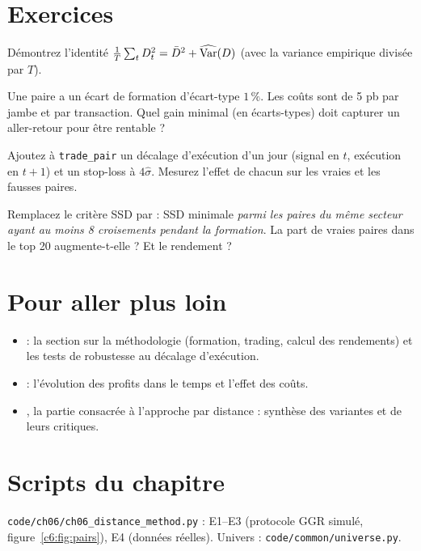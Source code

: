 \section{Exercices}

\begin{exercise}
Démontrez l'identité $\frac1T\sum_tD_t^2 = \bar D^2 + \widehat{\operatorname{Var}}(D)$ (avec la variance empirique divisée par $T$).
\end{exercise}

\begin{exercise}
Une paire a un écart de formation d'écart-type $1\,\%$. Les coûts sont de 5 pb par jambe et par transaction. Quel gain minimal (en écarts-types) doit capturer un aller-retour pour être rentable ?
\end{exercise}

\begin{exercise}[à coder]
Ajoutez à \texttt{trade\_pair} un décalage d'exécution d'un jour (signal en $t$, exécution en $t+1$) et un stop-loss à $4\hat\sigma$. Mesurez l'effet de chacun sur les vraies et les fausses paires.
\end{exercise}

\begin{exercise}[à coder]
Remplacez le critère SSD par : SSD minimale \emph{parmi les paires du même secteur ayant au moins 8 croisements pendant la formation}. La part de vraies paires dans le top 20 augmente-t-elle ? Et le rendement ?
\end{exercise}

\section{Pour aller plus loin}

\begin{toread}
\begin{itemize}[leftmargin=1.2em]
\item \citet{gatev2006} : la section sur la méthodologie (formation, trading, calcul des rendements) et les tests de robustesse au décalage d'exécution.
\item \citet{dofaff2010,dofaff2012} : l'évolution des profits dans le temps et l'effet des coûts.
\item \citet{krauss2017survey}, la partie consacrée à l'approche par distance : synthèse des variantes et de leurs critiques.
\end{itemize}
\end{toread}

\section{Scripts du chapitre}
\noindent\texttt{code/ch06/ch06\_distance\_method.py} : E1–E3 (protocole GGR simulé, figure~\ref{c6:fig:pairs}), E4 (données réelles). Univers : \texttt{code/common/universe.py}.
